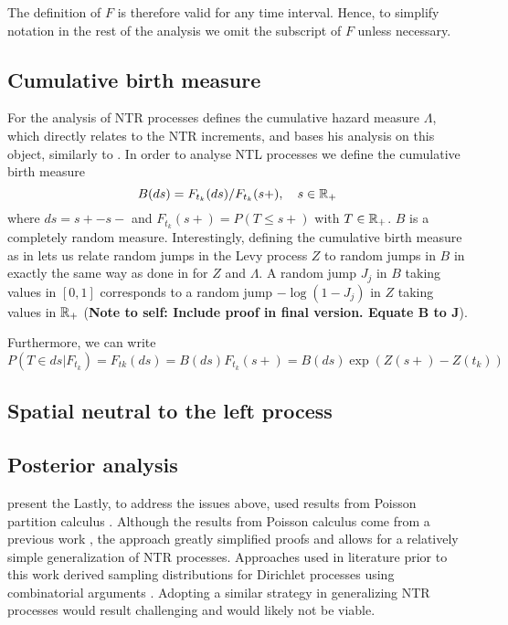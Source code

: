 The definition of $F$ is therefore valid for any time interval. Hence, to simplify notation in the rest of the analysis we omit the subscript of $F$ unless necessary.

\subsection{Cumulative birth measure}\label{CBM}

For the analysis of NTR processes \cite{james2006poisson} defines the cumulative hazard measure $\Lambda$, which directly relates to the NTR increments, and bases his analysis on this object, similarly to \cite{hjort1990nonparametric}. In order to analyse NTL processes we define the cumulative birth measure 
\begin{equation}\label{birth_measure}
B(ds) = F_{t_k}(ds)/F_{t_k}(s+), \quad s \in \mathbb{R}_+
\end{equation}
where $ds = s+ - s-$ and $F_{t_k}(s+) = P(T \leq s+)$ with $T \in \mathbb{R}_+$. $B$ is a completely random measure. Interestingly, defining the cumulative birth measure as in  lets us relate random jumps in the Levy process $Z$ to random jumps in $B$ in exactly the same way as done in \cite{james2006poisson} for $Z$ and $\Lambda$. A random jump $J_j$ in $B$ taking values in $[0,1]$ corresponds to a random jump $-\log(1 - J_j)$ in $Z$ taking values in $\mathbb{R}_+$ (\textbf{Note to self: Include proof in final version. Equate B to J}).

Furthermore, we can write
\begin{equation*}
P(T \in ds | F_{t_k}) = F_{tk}(ds) = B(ds)F_{t_k}(s+) = B(ds)\exp(Z(s+) - Z(t_k))
\end{equation*}

\subsection{Spatial neutral to the left process}\label{SPNTL_process}

\subsection{Posterior analysis}\label{SPNTL_posterior}


present the 
Lastly, to address the issues above, \cite{james2006poisson} used results from Poisson partition calculus \cite{james2005poisson}. Although the results from Poisson calculus come from a previous work \cite{james2005poisson}, the approach greatly simplified proofs and allows for a relatively simple generalization of NTR processes. Approaches used in literature prior to this work derived sampling distributions for Dirichlet processes using combinatorial arguments \cite{antoniak1974mixtures,pitman2002combinatorial}. Adopting a similar strategy in generalizing NTR processes would result challenging and would likely not be viable. 

